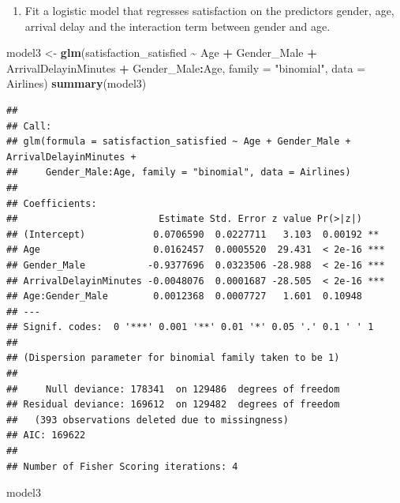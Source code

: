 \documentclass[
]{article}
\newenvironment{Shaded}{\begin{snugshade}}{\end{snugshade}}
\newcommand{\AttributeTok}[1]{\textcolor[rgb]{0.13,0.29,0.53}{#1}}
\newcommand{\FunctionTok}[1]{\textcolor[rgb]{0.13,0.29,0.53}{\textbf{#1}}}
\newcommand{\NormalTok}[1]{#1}
\newcommand{\OtherTok}[1]{\textcolor[rgb]{0.56,0.35,0.01}{#1}}
\newcommand{\SpecialCharTok}[1]{\textcolor[rgb]{0.81,0.36,0.00}{\textbf{#1}}}
\newcommand{\StringTok}[1]{\textcolor[rgb]{0.31,0.60,0.02}{#1}}
\providecommand{\tightlist}{%
  \setlength{\itemsep}{0pt}\setlength{\parskip}{0pt}}
\begin{document}
\newpage

\begin{enumerate}
\def\labelenumi{\arabic{enumi}.}
\setcounter{enumi}{6}
\tightlist
\item
  Fit a logistic model that regresses satisfaction on the predictors
  gender, age, arrival delay and the interaction term between gender and
  age.
\end{enumerate}

\begin{Shaded}
\begin{Highlighting}[]
\NormalTok{model3 }\OtherTok{\textless{}{-}} \FunctionTok{glm}\NormalTok{(satisfaction\_satisfied }\SpecialCharTok{\textasciitilde{}}\NormalTok{ Age }\SpecialCharTok{+}\NormalTok{ Gender\_Male }\SpecialCharTok{+}\NormalTok{ ArrivalDelayinMinutes }\SpecialCharTok{+}\NormalTok{ Gender\_Male}\SpecialCharTok{:}\NormalTok{Age, }\AttributeTok{family =} \StringTok{"binomial"}\NormalTok{, }\AttributeTok{data =}\NormalTok{ Airlines)}
\FunctionTok{summary}\NormalTok{(model3)}
\end{Highlighting}
\end{Shaded}

\begin{verbatim}
## 
## Call:
## glm(formula = satisfaction_satisfied ~ Age + Gender_Male + ArrivalDelayinMinutes + 
##     Gender_Male:Age, family = "binomial", data = Airlines)
## 
## Coefficients:
##                         Estimate Std. Error z value Pr(>|z|)    
## (Intercept)            0.0706590  0.0227711   3.103  0.00192 ** 
## Age                    0.0162457  0.0005520  29.431  < 2e-16 ***
## Gender_Male           -0.9377696  0.0323506 -28.988  < 2e-16 ***
## ArrivalDelayinMinutes -0.0048076  0.0001687 -28.505  < 2e-16 ***
## Age:Gender_Male        0.0012368  0.0007727   1.601  0.10948    
## ---
## Signif. codes:  0 '***' 0.001 '**' 0.01 '*' 0.05 '.' 0.1 ' ' 1
## 
## (Dispersion parameter for binomial family taken to be 1)
## 
##     Null deviance: 178341  on 129486  degrees of freedom
## Residual deviance: 169612  on 129482  degrees of freedom
##   (393 observations deleted due to missingness)
## AIC: 169622
## 
## Number of Fisher Scoring iterations: 4
\end{verbatim}

\begin{Shaded}
\begin{Highlighting}[]
\NormalTok{model3}
\end{Highlighting}
\end{Shaded}
\end{document}
